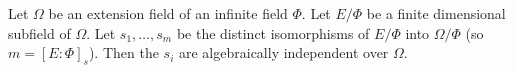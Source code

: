 Let $\Omega$ be an extension field of an infinite field $\Phi$. Let $E/\Phi$ be a finite dimensional subfield of $\Omega$. Let $s_1, \ldots, s_m$ be the distinct isomorphisms of $E/\Phi$ into $\Omega/\Phi$ (so $m = [E:\Phi]_s$). Then the $s_i$ are algebraically independent over $\Omega$.
